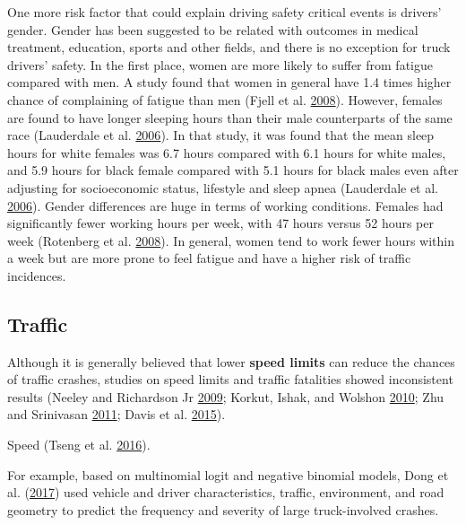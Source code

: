 \documentclass[12pt]{book}
\numberwithin{equation}{chapter}
\begin{document}
One more risk factor that could explain driving safety critical events is drivers' gender. Gender has been suggested to be related with outcomes in medical treatment, education, sports and other fields, and there is no exception for truck drivers' safety. In the first place, women are more likely to suffer from fatigue compared with men. A study found that women in general have 1.4 times higher chance of complaining of fatigue than men (Fjell et al. \protect\hyperlink{ref-fjell2008perceived}{2008}). However, females are found to have longer sleeping hours than their male counterparts of the same race (Lauderdale et al. \protect\hyperlink{ref-lauderdale2006objectively}{2006}). In that study, it was found that the mean sleep hours for white females was 6.7 hours compared with 6.1 hours for white males, and 5.9 hours for black female compared with 5.1 hours for black males even after adjusting for socioeconomic status, lifestyle and sleep apnea (Lauderdale et al. \protect\hyperlink{ref-lauderdale2006objectively}{2006}). Gender differences are huge in terms of working conditions. Females had significantly fewer working hours per week, with 47 hours versus 52 hours per week (Rotenberg et al. \protect\hyperlink{ref-rotenberg2008gender}{2008}). In general, women tend to work fewer hours within a week but are more prone to feel fatigue and have a higher risk of traffic incidences.

\hypertarget{traffic}{%
\subsection{Traffic}\label{traffic}}

Although it is generally believed that lower \textbf{speed limits} can reduce the chances of traffic crashes, studies on speed limits and traffic fatalities showed inconsistent results (Neeley and Richardson Jr \protect\hyperlink{ref-neeley2009effect}{2009}; Korkut, Ishak, and Wolshon \protect\hyperlink{ref-korkut2010freeway}{2010}; Zhu and Srinivasan \protect\hyperlink{ref-zhu2011comprehensive}{2011}; Davis et al. \protect\hyperlink{ref-davis2015longitudinal}{2015}).

Speed (Tseng et al. \protect\hyperlink{ref-tseng2016comprehensive}{2016}).

For example, based on multinomial logit and negative binomial models, Dong et al. (\protect\hyperlink{ref-dong2017estimating}{2017}) used vehicle and driver characteristics, traffic, environment, and road geometry to predict the frequency and severity of large truck-involved crashes.
\end{document}
